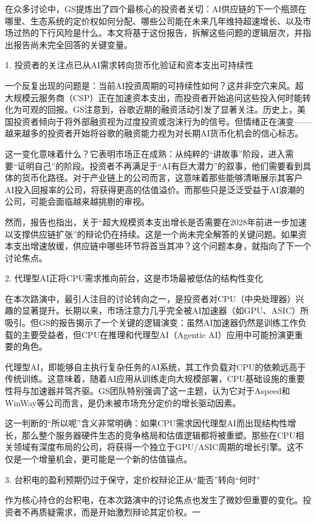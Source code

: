 \documentclass[11pt]{ctexart}
\begin{document}
在众多讨论中，GS提炼出了四个最核心的投资者关切：AI供应链的下一个瓶颈在哪里、生态系统的定价权如何分配、哪些公司能在未来几年维持超速增长、以及市场过热的下行风险是什么。本文将基于这份报告，拆解这些问题的逻辑层次，并指出报告尚未完全回答的关键变量。

1. 投资者的关注点已从AI需求转向货币化验证和资本支出可持续性

一个反复出现的问题是：当前AI投资周期的可持续性如何？这并非空穴来风。超大规模云服务商（CSP）正在加速资本支出，而投资者开始追问这些投入何时能转化为可观的回报。GS注意到，谷歌近期的融资活动引发了显著关注。历史上，美国投资者倾向于将外部融资视为过度投资或泡沫行为的信号。但情绪正在演变——越来越多的投资者开始将谷歌的融资能力视为对长期AI货币化机会的信心标志。

这一变化意味着什么？它表明市场正在成熟：从纯粹的“讲故事”阶段，进入需要“证明自己”的阶段。投资者不再满足于“AI有巨大潜力”的叙事，他们需要看到具体的货币化路径。对于产业链上的公司而言，这意味着那些能够清晰展示其客户AI投入回报率的公司，将获得更高的估值溢价。而那些只是泛泛受益于AI浪潮的公司，可能会面临越来越挑剔的审视。

然而，报告也指出，关于“超大规模资本支出增长是否需要在2028年前进一步加速以支撑供应链扩张”的辩论仍在持续。这是一个尚未完全解答的关键问题。如果资本支出增速放缓，供应链中哪些环节将首当其冲？这个问题本身，就指向了下一个讨论焦点。

2. 代理型AI正将CPU需求推向前台，这是市场最被低估的结构性变化

在本次路演中，最引人注目的讨论转向之一，是投资者对CPU（中央处理器）兴趣的显著提升。长期以来，市场注意力几乎完全被AI加速器（如GPU、ASIC）所吸引。但GS的报告揭示了一个关键的逻辑演变：虽然AI加速器仍然是训练工作负载的主要受益者，但CPU在推理和代理型AI（Agentic AI）应用中可能扮演更重要的角色。

代理型AI，即能够自主执行复杂任务的AI系统，其工作负载对CPU的依赖远高于传统训练。这意味着，随着AI应用从训练走向大规模部署，CPU基础设施的重要性将与加速器并驾齐驱。GS团队特别强调了这一主题，认为它对于Aspeed和WinWay等公司而言，是仍未被市场充分定价的增长驱动因素。

这一判断的“所以呢”含义非常明确：如果CPU需求因代理型AI而出现结构性增长，那么整个服务器硬件生态的竞争格局和估值逻辑都将被重塑。那些在CPU相关领域有深度布局的公司，将获得一个独立于GPU/ASIC周期的增长引擎。这不仅是一个增量机会，更可能是一个新的估值锚点。

3. 台积电的盈利预期仍过于保守，定价权辩论正从“能否”转向“何时”

作为核心持仓的台积电，在本次路演中的讨论焦点也发生了微妙但重要的变化。投资者不再质疑需求，而是开始激烈辩论其定价权。一
\end{document}
